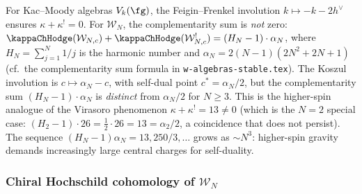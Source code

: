 \begin{remark}
\label{rem:wn-complementarity-nonzero}
%
For Kac--Moody algebras $V_k(\fg)$, the Feigin--Frenkel
involution $k \mapsto -k - 2h^\vee$ ensures
$\kappa + \kappa^! = 0$. For $\mathcal{W}_N$,
the complementarity sum is \emph{not} zero:
$\kappaChHodge(\mathcal{W}_{N,c}) + \kappaChHodge(\mathcal{W}_{N,c}^!)
= (H_N - 1) \cdot \alpha_N$, where $H_N = \sum_{j=1}^N 1/j$
is the harmonic number and $\alpha_N = 2(N{-}1)(2N^2{+}2N{+}1)$
\textup{(}cf.\ the complementarity sum formula in
\texttt{w-algebras-stable.tex}\textup{)}.
The Koszul involution is $c \mapsto \alpha_N - c$, with
self-dual point $c^* = \alpha_N/2$, but the complementarity sum
$(H_N - 1) \cdot \alpha_N$ is \emph{distinct} from $\alpha_N/2$
for $N \geq 3$.
This is the higher-spin analogue of the Virasoro phenomenon
$\kappa + \kappa^! = 13 \ne 0$
\textup{(}which is the $N = 2$ special case:
$(H_2 - 1) \cdot 26 = \tfrac{1}{2} \cdot 26 = 13 = \alpha_2/2$,
a coincidence that does not persist\textup{)}.
The sequence $(H_N - 1)\alpha_N = 13, 250/3, \ldots$ grows
as $\sim N^3$: higher-spin gravity demands
increasingly large central charges for
self-duality.
\end{remark}

\subsubsection{Chiral Hochschild cohomology of $\mathcal{W}_N$}
\label{subsubsec:wn-hochschild}

